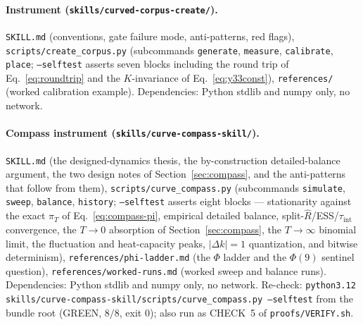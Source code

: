 \documentclass[11pt,a4paper]{article}
\theoremstyle{plain}
\theoremstyle{remark}
\theoremstyle{plain}
\begin{document}
\paragraph{Instrument (\texttt{skills/curved-corpus-create/}).}
\texttt{SKILL.md} (conventions, gate failure mode, anti-patterns, red flags), \texttt{scripts/create\_corpus.py} (subcommands \texttt{generate}, \texttt{measure}, \texttt{calibrate}, \texttt{place}; \texttt{--selftest} asserts seven blocks including the round trip of Eq.~\eqref{eq:roundtrip} and the $K$-invariance of Eq.~\eqref{eq:y33const}), \texttt{references/} (worked calibration example). Dependencies: Python stdlib and numpy only, no network.

\paragraph{Compass instrument (\texttt{skills/curve-compass-skill/}).}
\texttt{SKILL.md} (the designed-dynamics thesis, the by-construction
detailed-balance argument, the two design notes of Section~\ref{sec:compass}, and
the anti-patterns that follow from them),
\texttt{scripts/curve\_compass.py} (subcommands \texttt{simulate},
\texttt{sweep}, \texttt{balance}, \texttt{history}; \texttt{--selftest} asserts
eight blocks --- stationarity against the exact $\pi_T$ of
Eq.~\eqref{eq:compass-pi}, empirical detailed balance, split-$\hat R$/ESS/$\tau_{\mathrm{int}}$
convergence, the $T\to0$ absorption of Section~\ref{sec:compass}, the $T\to\infty$
binomial limit, the fluctuation and heat-capacity peaks, $|\Delta k|=1$
quantization, and bitwise determinism),
\texttt{references/phi-ladder.md} (the $\Phi$ ladder and the $\Phi(9)$ sentinel
question), \texttt{references/worked-runs.md} (worked sweep and balance runs).
Dependencies: Python stdlib and numpy only, no network. Re-check:
\texttt{python3.12 skills/curve-compass-skill/scripts/curve\_compass.py --selftest}
from the bundle root (GREEN, $8/8$, exit $0$); also run as CHECK~5 of
\texttt{proofs/VERIFY.sh}.
\end{document}
